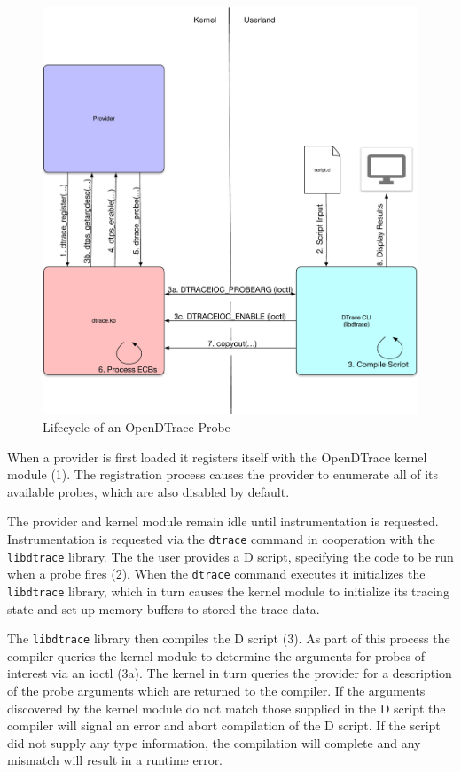 \begin{figure}[htpb]
	\centering
	\includegraphics[width=0.8\linewidth]{dtrace-lifecycle.pdf}
	\caption{Lifecycle of an OpenDTrace Probe}
	\label{fig:lifecycle}
\end{figure}

When a provider is first loaded it registers itself with the
OpenDTrace kernel module (1). The registration process causes the
provider to enumerate all of its available probes, which are also
disabled by default.

The provider and kernel module remain idle until instrumentation is
requested. Instrumentation is requested via the \texttt{dtrace}
command in cooperation with the \texttt{libdtrace} library.  The the
user provides a D script, specifying the code to be run when a probe
fires (2). When the \texttt{dtrace} command executes it initializes
the \texttt{libdtrace} library, which in turn causes the kernel module
to initialize its tracing state and set up memory buffers to stored
the trace data.

The \texttt{libdtrace} library then compiles the D script (3). As part
of this process the compiler queries the kernel module to determine
the arguments for probes of interest via an ioctl (3a). The kernel in
turn queries the provider for a description of the probe arguments
which are returned to the compiler.  If the arguments discovered by
the kernel module do not match those supplied in the D script the
compiler will signal an error and abort compilation of the D script.
If the script did not supply any type information, the compilation
will complete and any mismatch will result in a runtime error.

